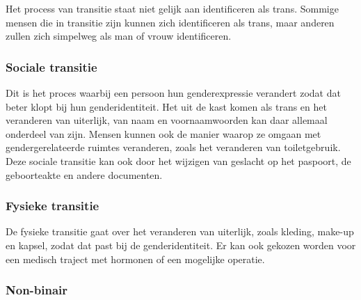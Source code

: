 \documentclass[12pt,openany]{book}
\begin{document}
Het process van transitie staat niet gelijk aan identificeren als trans. Sommige mensen die in transitie zijn kunnen zich identificeren als trans, maar anderen zullen zich simpelweg als man of vrouw identificeren.

\subsubsection*{Sociale transitie}

Dit is het proces waarbij een persoon hun genderexpressie verandert zodat dat beter klopt bij hun genderidentiteit. Het uit de kast komen als trans en het veranderen van uiterlijk, van naam en voornaamwoorden kan daar allemaal onderdeel van zijn. Mensen kunnen ook de manier waarop ze omgaan met gendergerelateerde ruimtes veranderen, zoals het veranderen van toiletgebruik. Deze sociale transitie kan ook door het wijzigen van geslacht op het paspoort, de geboorteakte en andere documenten.

\subsubsection*{Fysieke transitie}

De fysieke transitie gaat over het veranderen van uiterlijk, zoals kleding, make-up en kapsel, zodat dat past bij de genderidentiteit. Er kan ook gekozen worden voor een medisch traject met hormonen of een mogelijke operatie.  

\begin{figure}[h]
    \centering
\end{figure}

\subsubsection*{Non-binair}
\end{document}
